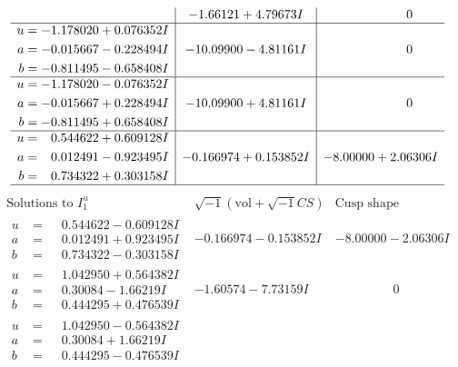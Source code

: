 \documentclass[1p]{elsarticle_modified}
\theoremstyle{definition}
\newcommand{\I}{\sqrt{-1}}
\begin{document}
$$\begin{array}{c|c|c}
 & -1.66121 + 4.79673 I & \phantom{-0.000000 } 0 \\ \hline\begin{aligned}
u &= -1.178020 + 0.076352 I \\
a &= -0.015667 - 0.228494 I \\
b &= -0.811495 - 0.658408 I\end{aligned}
 & -10.09900 - 4.81161 I & \phantom{-0.000000 } 0 \\ \hline\begin{aligned}
u &= -1.178020 - 0.076352 I \\
a &= -0.015667 + 0.228494 I \\
b &= -0.811495 + 0.658408 I\end{aligned}
 & -10.09900 + 4.81161 I & \phantom{-0.000000 } 0 \\ \hline\begin{aligned}
u &= \phantom{-}0.544622 + 0.609128 I \\
a &= \phantom{-}0.012491 - 0.923495 I \\
b &= \phantom{-}0.734322 + 0.303158 I\end{aligned}
 & -0.166974 + 0.153852 I & -8.00000 + 2.06306 I\\
 \hline 
 \end{array}$$\newpage$$\begin{array}{c|c|c}  
\text{Solutions to }I^u_{1}& \I (\text{vol} + \sqrt{-1}CS) & \text{Cusp shape}\\
 \hline 
\begin{aligned}
u &= \phantom{-}0.544622 - 0.609128 I \\
a &= \phantom{-}0.012491 + 0.923495 I \\
b &= \phantom{-}0.734322 - 0.303158 I\end{aligned}
 & -0.166974 - 0.153852 I & -8.00000 - 2.06306 I \\ \hline\begin{aligned}
u &= \phantom{-}1.042950 + 0.564382 I \\
a &= \phantom{-}0.30084 - 1.66219 I \\
b &= \phantom{-}0.444295 + 0.476539 I\end{aligned}
 & -1.60574 - 7.73159 I & \phantom{-0.000000 } 0 \\ \hline\begin{aligned}
u &= \phantom{-}1.042950 - 0.564382 I \\
a &= \phantom{-}0.30084 + 1.66219 I \\
b &= \phantom{-}0.444295 - 0.476539 I\end{aligned}

\end{array}$$
\end{document}
